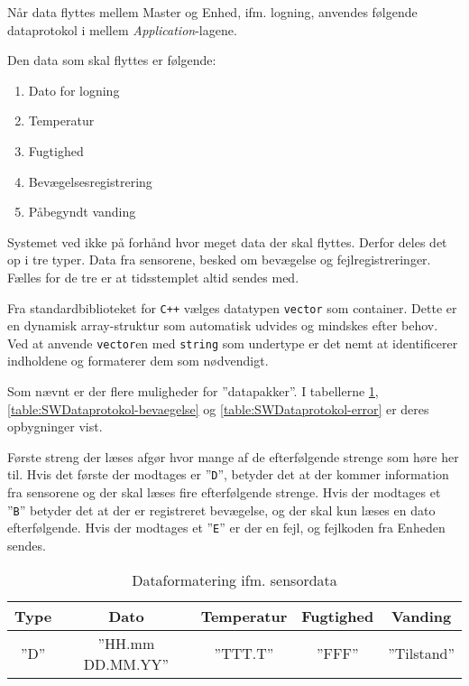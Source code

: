 
Når data flyttes mellem Master og Enhed, ifm. logning, anvendes følgende dataprotokol i mellem \textit{Application}-lagene.

Den data som skal flyttes er følgende:

\begin{enumerate}
	\item Dato for logning
	\item Temperatur
	\item Fugtighed
	\item Bevægelsesregistrering
	\item Påbegyndt vanding
\end{enumerate}

Systemet ved ikke på forhånd hvor meget data der skal flyttes. Derfor deles det op i tre typer. Data fra sensorene, besked om bevægelse og fejlregistreringer.
Fælles for de tre er at tidsstemplet altid sendes med.

Fra standardbiblioteket for \verb'C++' vælges datatypen \verb+vector+ som container. Dette er en dynamisk array-struktur som automatisk udvides og mindskes efter behov.
Ved at anvende \verb+vector+en med \verb+string+ som undertype er det nemt at identificerer indholdene og formaterer dem som nødvendigt.

Som nævnt er der flere muligheder for ''datapakker''. I tabellerne \ref{table:SWDataprotokol-sensor}, \ref{table:SWDataprotokol-bevaegelse} og \ref{table:SWDataprotokol-error} er deres opbygninger vist.

Første streng der læses afgør hvor mange af de efterfølgende strenge som høre her til. Hvis det første der modtages er ''\verb+D+'', betyder det at der kommer information fra sensorene og der skal læses fire efterfølgende strenge.
Hvis der modtages et ''\verb+B+'' betyder det at der er registreret bevægelse, og der skal kun læses en dato efterfølgende. Hvis der modtages et ''\verb+E+'' er der en fejl, og fejlkoden fra Enheden sendes.

\begin{table}[h]
	\caption{Dataformatering ifm. sensordata}
	\centering
	\begin{tabular}{|c|c|c|c|c|}
		\hline 
		\textbf{Type} & \textbf{Dato} & \textbf{Temperatur} & \textbf{Fugtighed} & \textbf{Vanding} \\ 
		\hline 
		''D'' & ''HH.mm DD.MM.YY'' & ''TTT.T'' & ''FFF'' & ''Tilstand'' \\ 
		\hline 
	\end{tabular} 
	\label{table:SWDataprotokol-sensor}
\end{table}

